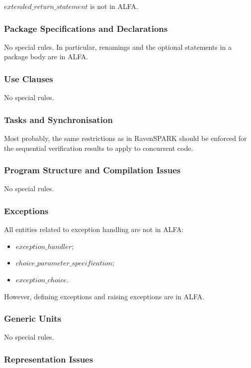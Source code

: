 \documentclass{article}
\newcommand{\bnf}[1]{$\mathit{#1}$}
\begin{document}
\bnf{extended\_return\_statement} is not in ALFA.

\subsubsection{Package Specifications and Declarations}

No special rules. In particular, renamings and the optional statements in a
package body are in ALFA.

\subsubsection{Use Clauses}

No special rules.

\subsubsection{Tasks and Synchronisation}

Most probably, the same restrictions as in RavenSPARK should be enforced for
the sequential verification results to apply to concurrent code.

\subsubsection{Program Structure and Compilation Issues}

No special rules.

\subsubsection{Exceptions}

All entities related to exception handling are not in ALFA:
\begin{itemize}
\item \bnf{exception\_handler};
\item \bnf{choice\_parameter\_specification};
\item \bnf{exception\_choice}.
\end{itemize}

However, defining exceptions and raising exceptions are in ALFA.

\subsubsection{Generic Units}

No special rules.

\subsubsection{Representation Issues}
\end{document}
